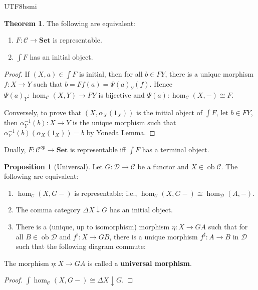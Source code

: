 \documentclass[12pt]{article}
\theoremstyle{definition}
\newtheorem{theorem}[definition]{Theorem}
\newtheorem{property}[definition]{Proposition}
\newcommand\<{\langle}
\renewcommand\>{\rangle}
\DeclareMathOperator{\ob}{ob}
\begin{document}
\begin{CJK}{UTF8}{bsmi}
\begin{theorem}
    The following are equivalent:
    \begin{enumerate}
        \item $F:\mathcal{C}\to\textbf{Set}$ is representable.
        \item $\int F$ has an initial object.
    \end{enumerate}
\end{theorem}
\begin{proof}    
    If $(X, a)\in\int F$ is initial, then for all $b\in FY$, there is a unique morphism $f:X\to Y$ such that $b=Ff(a)=\Psi(a)_Y(f)$.
    Hence $\Psi(a)_Y:\hom_\mathcal{C}(X, Y)\to FY$ is bijective and $\Psi(a):\hom_\mathcal{C}(X, -)\cong F$.
    
    Conversely, to prove that $(X, \alpha_X(1_X))$ is the initial object of $\int F$, let $b\in FY$, then $\alpha_Y^{-1}(b):X\to Y$ is the unique morphism such that $\alpha_Y^{-1}(b)(\alpha_X(1_X))=b$ by Yoneda Lemma.
\end{proof}

Dually, $F:\mathcal{C}^{op}\to\textbf{Set}$ is representable iff $\int F$ has a terminal object.

\begin{property}[Universal]
    Let $G:\mathcal{D}\to\mathcal{C}$ be a functor and $X\in\ob\mathcal{C}$.
    The following are equivalent:
    \begin{enumerate}
        \item $\hom_\mathcal{C}(X, G-)$ is representable; i.e., $\hom_\mathcal{C}(X, G-)\cong\hom_\mathcal{D}(A, -)$.
        \item The comma category $\Delta X\downarrow G$ has an initial object.
        \item There is a (unique, up to isomorphism) morphism $\eta:X\to GA$ such that for all $B\in\ob\mathcal{D}$ and $f^\flat:X\to GB$, there is a unique morphism $f^\sharp:A\to B$ in $\mathcal{D}$ such that the following diagram commute:
        \begin{center}
        \end{center}
    \end{enumerate}
    The morphism $\eta:X\to GA$ is called a \textbf{universal morphism}.
\end{property}
\begin{proof}
    $\int\hom_\mathcal{C}(X, G-)\cong\Delta  X\downarrow G$.
\end{proof}


\end{CJK}
\end{document}

